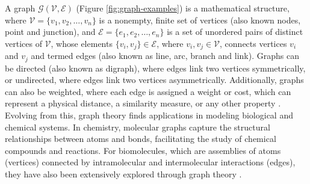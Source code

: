 \documentclass[Ingles]{phdthesis}
\begin{document}
A graph $\mathcal{G(V,E)}$ (Figure \ref{fig:graph-examples}) is a mathematical structure, where $\mathcal{V} = \{v_1, v_2, \dots, v_n\}$ is a nonempty, finite set of vertices (also known nodes, point and junction), and $\mathcal{E} = \{e_1, e_2, \dots, e_n\}$ is a set of unordered pairs of distinct vertices of $\mathcal{V}$, whose elements $\{v_i,v_j\} \in \mathcal{E}$, where $v_i,v_j \in \mathcal{V}$, connects vertices $v_i$ and $v_j$ and termed edges (also known as line, arc, branch and link). Graphs can be directed (also known as digraph), where edges link two vertices symmetrically, or undirected, where edges link two vertices asymmetrically. Additionally, graphs can also be weighted, where each edge is assigned a weight or cost, which can represent a physical distance, a similarity measure, or any other property \cite{foulds1995,bondy1976,majeed2020,black2020}. Evolving from this, graph theory finds applications in modeling biological and chemical systems. In chemistry, molecular graphs capture the structural relationships between atoms and bonds, facilitating the study of chemical compounds and reactions. For biomolecules, which are assemblies of atoms (vertices) connected by intramolecular and intermolecular interactions (edges), they have also been extensively explored through graph theory \cite{vishveshwara2002,mason2007}.
\end{document}
